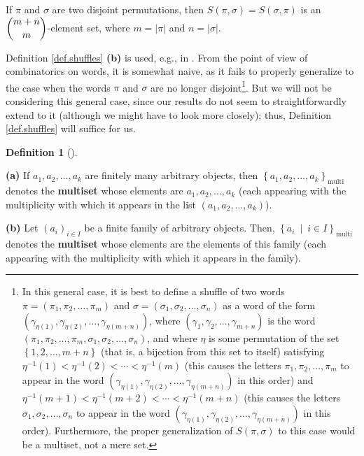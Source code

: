 \documentclass[numbers=enddot,12pt,final,onecolumn,notitlepage]{scrartcl}%
\theoremstyle{definition}
\newtheorem{defi}[theo]{Definition}
\newenvironment{definition}[1][]
{\begin{defi}[#1]\begin{leftbar}}
{\end{leftbar}\end{defi}}
\begin{document}
If $\pi$ and $\sigma$ are two disjoint permutations, then $S\left(  \pi
,\sigma\right)  =S\left(  \sigma,\pi\right)  $ is an $\dbinom{m+n}{m}$-element
set, where $m=\left\vert \pi\right\vert $ and $n=\left\vert \sigma\right\vert
$.

Definition \ref{def.shuffles} \textbf{(b)} is used, e.g., in \cite{Greene88}.
From the point of view of combinatorics on words, it is somewhat naive, as it
fails to properly generalize to the case when the words $\pi$ and $\sigma$ are
no longer disjoint\footnote{In this general case, it is best to define a
shuffle of two words $\pi=\left(  \pi_{1},\pi_{2},\ldots,\pi_{m}\right)  $ and
$\sigma=\left(  \sigma_{1},\sigma_{2},\ldots,\sigma_{n}\right)  $ as a word of
the form $\left(  \gamma_{\eta\left(  1\right)  },\gamma_{\eta\left(
2\right)  },\ldots,\gamma_{\eta\left(  m+n\right)  }\right)  $, where $\left(
\gamma_{1},\gamma_{2},\ldots,\gamma_{m+n}\right)  $ is the word $\left(
\pi_{1},\pi_{2},\ldots,\pi_{m},\sigma_{1},\sigma_{2},\ldots,\sigma_{n}\right)
$, and where $\eta$ is some permutation of the set $\left\{  1,2,\ldots
,m+n\right\}  $ (that is, a bijection from this set to itself) satisfying
$\eta^{-1}\left(  1\right)  <\eta^{-1}\left(  2\right)  <\cdots<\eta
^{-1}\left(  m\right)  $ (this causes the letters $\pi_{1},\pi_{2},\ldots
,\pi_{m}$ to appear in the word $\left(  \gamma_{\eta\left(  1\right)
},\gamma_{\eta\left(  2\right)  },\ldots,\gamma_{\eta\left(  m+n\right)
}\right)  $ in this order) and $\eta^{-1}\left(  m+1\right)  <\eta^{-1}\left(
m+2\right)  <\cdots<\eta^{-1}\left(  m+n\right)  $ (this causes the letters
$\sigma_{1},\sigma_{2},\ldots,\sigma_{n}$ to appear in the word $\left(
\gamma_{\eta\left(  1\right)  },\gamma_{\eta\left(  2\right)  },\ldots
,\gamma_{\eta\left(  m+n\right)  }\right)  $ in this order). Furthermore, the
proper generalization of $S\left(  \pi,\sigma\right)  $ to this case would be
a multiset, not a mere set.}. But we will not be considering this general
case, since our results do not seem to straightforwardly extend to it
(although we might have to look more closely); thus, Definition
\ref{def.shuffles} will suffice for us.

\begin{definition}
\textbf{(a)} If $a_{1},a_{2},\ldots,a_{k}$ are finitely many arbitrary
objects, then $\left\{  a_{1},a_{2},\ldots,a_{k}\right\}
_{\operatorname*{multi}}$ denotes the \textbf{multiset} whose elements are
$a_{1},a_{2},\ldots,a_{k}$ (each appearing with the multiplicity with which it
appears in the list $\left(  a_{1},a_{2},\ldots,a_{k}\right)  $).

\textbf{(b)} Let $\left(  a_{i}\right)  _{i\in I}$ be a finite family of
arbitrary objects. Then, $\left\{  a_{i}\ \mid\ i\in I\right\}
_{\operatorname*{multi}}$ denotes the \textbf{multiset} whose elements are the
elements of this family (each appearing with the multiplicity with which it
appears in the family).
\end{definition}
\end{document}

